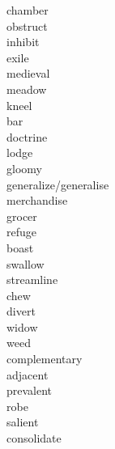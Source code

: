 \documentclass[a4paper, 11pt]{ctexart}
\begin{document}
\begin{multicols*}{3}
\begin{description}
\item[chamber]

\item[obstruct]

\item[inhibit]

\item[exile]

\item[medieval]

\item[meadow]

\item[kneel]

\item[bar]

\item[doctrine]

\item[lodge]

\item[gloomy]

\item[generalize/generalise]

\item[merchandise]

\item[grocer]

\item[refuge]

\item[boast]

\item[swallow]

\item[streamline]

\item[chew]

\item[divert]

\item[widow]

\item[weed]

\item[complementary]

\item[adjacent]

\item[prevalent]

\item[robe]

\item[salient]

\item[consolidate]


\end{description}
\end{multicols*}
\end{document}
